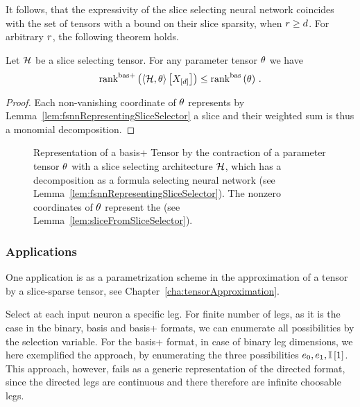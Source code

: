 It follows, that the expressivity of the slice selecting neural network coincides with the set of tensors with a bound on their slice sparsity, when $r\geq d$.
For arbitrary $r$, the following theorem holds.

\begin{theorem}
	Let $\mathcal{H}$ be a slice selecting tensor.
	For any parameter tensor $\theta$ we have
		\[ \mathrm{rank}^{\mathrm{bas+}}\left(\left\langle \mathcal{H},\theta\right\rangle \left[ X_{[d]} \right]\right) \leq \mathrm{rank}^{\mathrm{bas}}\left(\theta\right) \, . \]
\end{theorem}
\begin{proof}
	Each non-vanishing coordinate of $\theta$ represents by Lemma~\ref{lem:fsnnRepresentingSliceSelector} a slice and their weighted sum is thus a monomial decomposition.
\end{proof}


\begin{figure}[h]
	\begin{center}
		
	\end{center}
	\caption{Representation of a basis+ Tensor by the contraction of a parameter tensor $\theta$ with a slice selecting architecture $\mathcal{H}$, which has a decomposition as a formula selecting neural network (see Lemma~\ref{lem:fsnnRepresentingSliceSelector}).
	The nonzero coordinates of $\theta$ represent the (see Lemma~\ref{lem:sliceFromSliceSelector}).}
\end{figure}\label{fig:sliceSelectingNN}


\subsubsection{Applications}

One application is as a parametrization scheme in the approximation of a tensor by a slice-sparse tensor, see Chapter~\ref{cha:tensorApproximation}.



\begin{remark}
	Select at each input neuron a specific leg.
	For finite number of legs, as it is the case in the binary, basis and basis+ formats, we can enumerate all possibilities by the selection variable.
	For the basis+ format, in case of binary leg dimensions, we here exemplified the approach, by enumerating the three possibilities $e_{0},e_{1},\mathbb{I}\left[1\right]$.
	This approach, however, fails as a generic representation of the directed format, since the directed legs are continuous and there therefore are infinite choosable legs.
\end{remark}





